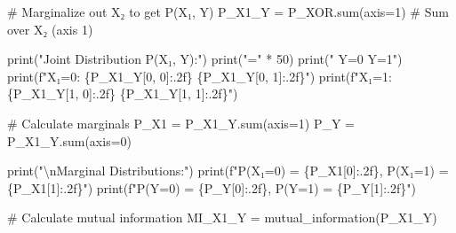 \documentclass[
  11pt,
  letterpaper,
  oneside,
  openany]{book}
\newenvironment{Shaded}{\begin{snugshade}}{\end{snugshade}}
\newcommand{\BuiltInTok}[1]{\textcolor[rgb]{0.00,0.23,0.31}{#1}}
\newcommand{\CharTok}[1]{\textcolor[rgb]{0.13,0.47,0.30}{#1}}
\newcommand{\CommentTok}[1]{\textcolor[rgb]{0.37,0.37,0.37}{#1}}
\newcommand{\DecValTok}[1]{\textcolor[rgb]{0.68,0.00,0.00}{#1}}
\newcommand{\NormalTok}[1]{\textcolor[rgb]{0.00,0.23,0.31}{#1}}
\newcommand{\OperatorTok}[1]{\textcolor[rgb]{0.37,0.37,0.37}{#1}}
\newcommand{\SpecialCharTok}[1]{\textcolor[rgb]{0.37,0.37,0.37}{#1}}
\newcommand{\SpecialStringTok}[1]{\textcolor[rgb]{0.13,0.47,0.30}{#1}}
\newcommand{\StringTok}[1]{\textcolor[rgb]{0.13,0.47,0.30}{#1}}
\begin{document}
\begin{Shaded}
\begin{Highlighting}[]
\CommentTok{\# Marginalize out X₂ to get P(X₁, Y)}
\NormalTok{P\_X1\_Y }\OperatorTok{=}\NormalTok{ P\_XOR.}\BuiltInTok{sum}\NormalTok{(axis}\OperatorTok{=}\DecValTok{1}\NormalTok{)  }\CommentTok{\# Sum over X₂ (axis 1)}

\BuiltInTok{print}\NormalTok{(}\StringTok{"Joint Distribution P(X₁, Y):"}\NormalTok{)}
\BuiltInTok{print}\NormalTok{(}\StringTok{"="} \OperatorTok{*} \DecValTok{50}\NormalTok{)}
\BuiltInTok{print}\NormalTok{(}\StringTok{"          Y=0    Y=1"}\NormalTok{)}
\BuiltInTok{print}\NormalTok{(}\SpecialStringTok{f"X₁=0:    }\SpecialCharTok{\{}\NormalTok{P\_X1\_Y[}\DecValTok{0}\NormalTok{, }\DecValTok{0}\NormalTok{]}\SpecialCharTok{:.2f\}}\SpecialStringTok{   }\SpecialCharTok{\{}\NormalTok{P\_X1\_Y[}\DecValTok{0}\NormalTok{, }\DecValTok{1}\NormalTok{]}\SpecialCharTok{:.2f\}}\SpecialStringTok{"}\NormalTok{)}
\BuiltInTok{print}\NormalTok{(}\SpecialStringTok{f"X₁=1:    }\SpecialCharTok{\{}\NormalTok{P\_X1\_Y[}\DecValTok{1}\NormalTok{, }\DecValTok{0}\NormalTok{]}\SpecialCharTok{:.2f\}}\SpecialStringTok{   }\SpecialCharTok{\{}\NormalTok{P\_X1\_Y[}\DecValTok{1}\NormalTok{, }\DecValTok{1}\NormalTok{]}\SpecialCharTok{:.2f\}}\SpecialStringTok{"}\NormalTok{)}

\CommentTok{\# Calculate marginals}
\NormalTok{P\_X1 }\OperatorTok{=}\NormalTok{ P\_X1\_Y.}\BuiltInTok{sum}\NormalTok{(axis}\OperatorTok{=}\DecValTok{1}\NormalTok{)}
\NormalTok{P\_Y }\OperatorTok{=}\NormalTok{ P\_X1\_Y.}\BuiltInTok{sum}\NormalTok{(axis}\OperatorTok{=}\DecValTok{0}\NormalTok{)}

\BuiltInTok{print}\NormalTok{(}\StringTok{"}\CharTok{\textbackslash{}n}\StringTok{Marginal Distributions:"}\NormalTok{)}
\BuiltInTok{print}\NormalTok{(}\SpecialStringTok{f"P(X₁=0) = }\SpecialCharTok{\{}\NormalTok{P\_X1[}\DecValTok{0}\NormalTok{]}\SpecialCharTok{:.2f\}}\SpecialStringTok{, P(X₁=1) = }\SpecialCharTok{\{}\NormalTok{P\_X1[}\DecValTok{1}\NormalTok{]}\SpecialCharTok{:.2f\}}\SpecialStringTok{"}\NormalTok{)}
\BuiltInTok{print}\NormalTok{(}\SpecialStringTok{f"P(Y=0) = }\SpecialCharTok{\{}\NormalTok{P\_Y[}\DecValTok{0}\NormalTok{]}\SpecialCharTok{:.2f\}}\SpecialStringTok{, P(Y=1) = }\SpecialCharTok{\{}\NormalTok{P\_Y[}\DecValTok{1}\NormalTok{]}\SpecialCharTok{:.2f\}}\SpecialStringTok{"}\NormalTok{)}

\CommentTok{\# Calculate mutual information}
\NormalTok{MI\_X1\_Y }\OperatorTok{=}\NormalTok{ mutual\_information(P\_X1\_Y)}


\end{Highlighting}
\end{Shaded}
\end{document}
